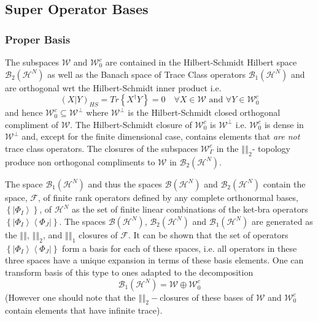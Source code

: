 \documentclass[aps,preprint]{revtex4}%
\begin{document}
\subsection{Super Operator Bases \label{bases}}

\subsubsection{Proper Basis}

The subspaces $\mathcal{W}$ and $\mathcal{W}_{0}^{c}$ are contained in the
Hilbert-Schmidt Hilbert space $\mathcal{B}_{2}\left(  \mathcal{H}^{N}\right)
$ as well as the Banach space of Trace Class operators $\mathcal{B}_{1}\left(
\mathcal{H}^{N}\right)  $ and are orthogonal wrt the Hilbert-Schmidt inner
product i.e.
\begin{equation}
\left(  X|Y\right)  _{HS}=Tr\left\{  X^{\dagger}Y\right\}  =0\quad\forall
X\in\mathcal{W}\text{ and }\forall Y\in\mathcal{W}_{0}^{c}%
\end{equation}
and hence $\mathcal{W}_{0}^{c}\subseteq\mathcal{W}^{\bot}$ where
$\mathcal{W}^{\bot}$ is the Hilbert-Schmidt closed orthogonal compliment of
$\mathcal{W}$. The Hilbert-Schmidt closure of $\mathcal{W}_{0}^{c}$ is
$\mathcal{W}^{\bot}$ i.e. $\mathcal{W}_{0}^{c}$ is dense in $\mathcal{W}%
^{\bot}$ and, except for the finite dimensional case, contains elements that
\emph{are not }trace class operators. The closures of the subspaces
$\mathcal{W}_{\Gamma}^{c}$ in the $\left\Vert {}\right\Vert _{2}$- topology
produce non orthogonal compliments to $\mathcal{W}$ in $\mathcal{B}_{2}\left(
\mathcal{H}^{N}\right)  $.

The space $\mathcal{B}_{1}\left(  \mathcal{H}^{N}\right)  $ and thus the
spaces $\mathcal{B}\left(  \mathcal{H}^{N}\right)  $ and $\mathcal{B}%
_{2}\left(  \mathcal{H}^{N}\right)  $ contain the space, $\mathcal{F}$, of
finite rank operators defined by any complete orthonormal bases, $\left\{
\left\vert \Phi_{I}\right\rangle \right\}  $, of $\mathcal{H}^{N}$ as the set
of finite linear combinations of the ket-bra operators $\left\{  \left\vert
\Phi_{I}\right\rangle \left\langle \Phi_{J}\right\vert \right\}  $. The spaces
$\mathcal{B}\left(  \mathcal{H}^{N}\right)  $, $\mathcal{B}_{2}\left(
\mathcal{H}^{N}\right)  $ and $\mathcal{B}_{1}\left(  \mathcal{H}^{N}\right)
$ are generated as the $\left\Vert {}\right\Vert $, $\left\Vert {}\right\Vert
_{2}$, and $\left\Vert {}\right\Vert _{1}$ closures of $\mathcal{F}$. It can
be shown that the set of operators $\left\{  \left\vert \Phi_{I}\right\rangle
\left\langle \Phi_{J}\right\vert \right\}  $ form a basis for each of these
spaces, i.e. all operators in these three spaces have a unique expansion in
terms of these basis elements. One can transform basis of this type to ones
adapted to the decomposition
\begin{equation}
\mathcal{B}_{1}\left(  \mathcal{H}^{N}\right)  =\mathcal{W\oplus W}_{0}^{c}%
\end{equation}
(However one should note that the $\left\Vert {}\right\Vert _{2}-$closures of
these bases of $\mathcal{W}$ and $\mathcal{W}_{0}^{c}$ contain elements that
have infinite trace).
\end{document}
